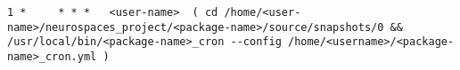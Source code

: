 \documentclass[12pt]{article}
\begin{document}
\begin{enumerate}
\begin{verbatim}
1 *     * * *   <user-name>  ( cd /home/<user-name>/neurospaces_project/<package-name>/source/snapshots/0 && /usr/local/bin/<package-name>_cron --config /home/<username>/<package-name>_cron.yml )
\end{verbatim}
\end{enumerate}








\end{document}
